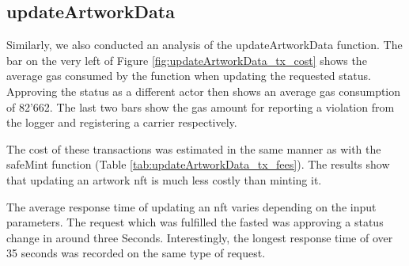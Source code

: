 \subsection*{updateArtworkData}
Similarly, we also conducted an analysis of the updateArtworkData function. The bar on the very left of Figure \ref{fig:updateArtworkData_tx_cost} shows the average gas consumed by the function when updating the requested status. Approving the status as a different actor then shows an average gas consumption of 82'662. The last two bars show the gas amount for reporting a violation from the logger and registering a carrier respectively.

The cost of these transactions was estimated in the same manner as with the safeMint function (Table \ref{tab:updateArtworkData_tx_fees}). The results show that updating an artwork \gls{nft} is much less costly than minting it. 

\begin{table}[h]
\caption{Estimated transaction fees updateArtworkData}
\label{tab:updateArtworkData_tx_fees}
\end{table}

The average response time of updating an \gls{nft} varies depending on the input parameters. The request which was fulfilled the fasted was approving a status change in around three Seconds. Interestingly, the longest response time of over 35 seconds was recorded on the same type of request.



